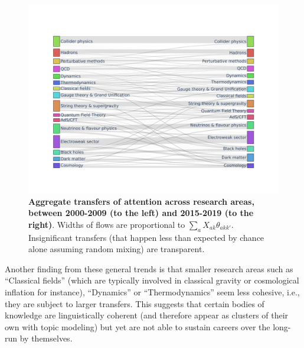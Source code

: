 \documentclass{article}
\begin{document}
 \begin{figure}[h]
     \centering
     \includegraphics[width=\textwidth]{plots/sankey_control_nu.pdf}
     \caption{\textbf{Aggregate transfers of attention across research areas, between 2000-2009 (to the left) and 2015-2019 (to the right)}. Widths of flows are proportional to $\sum_a X_{ak}\theta_{akk'}$. Insignificant transfers (that happen less than expected by chance alone assuming random mixing) are transparent. }
     \label{fig:sankey}
 \end{figure}

Another finding from these general trends is that smaller research areas such as ``Classical fields'' (which are typically involved in classical gravity or cosmological inflation for instance), ``Dynamics'' or ``Thermodynamics'' seem less cohesive, i.e., they are subject to larger transfers. This suggests that certain bodies of knowledge are linguistically coherent (and therefore appear as clusters of their own with topic modeling) but yet are not able to sustain careers over the long-run by themselves.
\end{document}
